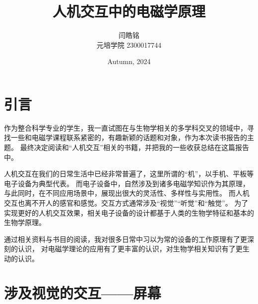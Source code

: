 \documentclass[UTF-8]{ctexart}
\title{人机交互中的电磁学原理}
\author{闫皓铭 \\ 元培学院 2300017744}
\date{Autumn, 2024}
\begin{document}
\maketitle

\section{引言}
作为整合科学专业的学生，我一直试图在与生物学相关的多学科交叉的领域中，寻找一些和电磁学课程联系紧密的，有趣新颖的话题和对象，作为本次读书报告的主题。
最终决定阅读和“人机交互”相关的书籍，并把我的一些收获总结在这篇报告中。

人机交互在我们的日常生活中已经非常普遍了，这里所谓的“机”，以手机、平板等电子设备为典型代表。
而电子设备中，自然涉及到诸多电磁学知识作为其原理，与此同时，在不同应用场景中，展现出很大的灵活性、多样性与实用性。
而人机交互也离不开人的感官和感觉。交互方式通常涉及“视觉”“听觉”和“触觉”。
为了实现更好的人机交互效果，相关电子设备的设计都基于人类的生物学特征和基本的生物学原理。

通过相关资料与书目的阅读，我对很多日常中习以为常的设备的工作原理有了更深刻的认识，
对电磁学理论的应用有了更丰富的认识，对生物学相关知识有了更生动的认识。
\section{涉及视觉的交互——屏幕} 
\end{document}
